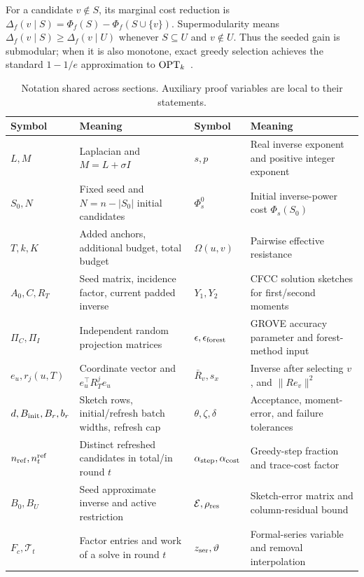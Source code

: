 For a candidate $v\notin S$, its marginal cost reduction is
$\Delta_f(v\mid S)=\Phi_f(S)-\Phi_f(S\cup\{v\})$.
Supermodularity means
$\Delta_f(v\mid S)\geq\Delta_f(v\mid U)$ whenever
$S\subseteq U$ and $v\notin U$. Thus the seeded gain is
submodular; when it is also monotone, exact greedy selection achieves
the standard $1-1/e$ approximation to $\mathrm{OPT}_k$~\cite{nemhauser1978}.

\begin{table}[t]
\centering\footnotesize
\caption{Notation shared across sections. Auxiliary proof variables are
local to their statements.}\label{tab:notation}
\begin{tabularx}{\textwidth}{@{}lXlX@{}}\toprule
Symbol & Meaning & Symbol & Meaning\\\midrule
$L,M$ & Laplacian and $M=L+\sigma I$ & $s,p$ & Real inverse exponent and positive integer exponent\\
$S_0,N$ & Fixed seed and $N=n-|S_0|$ initial candidates & $\Phi_s^0$ & Initial inverse-power cost $\Phi_s(S_0)$\\
$T,k,K$ & Added anchors, additional budget, total budget & $\Omega(u,v)$ & Pairwise effective resistance\\
$A_0,C,R_T$ & Seed matrix, incidence factor, current padded inverse & $Y_1,Y_2$ & CFCC solution sketches for first/second moments\\
$\Pi_C,\Pi_I$ & Independent random projection matrices & $\epsilon,\epsilon_{\rm forest}$ & GROVE accuracy parameter and forest-method input\\
$e_u,r_j(u,T)$ & Coordinate vector and $e_u^\top R_T^j e_u$ & $\bar R_v,s_x$ & Inverse after selecting $v$, and $\|Re_v\|^2$\\
$d,B_{\rm init},B_r,b_r$ & Sketch rows, initial/refresh batch widths, refresh cap & $\theta,\zeta,\delta$ & Acceptance, moment-error, and failure tolerances\\
$n_{\rm ref},n_t^{\rm ref}$ & Distinct refreshed candidates in total/in round $t$ & $\alpha_{\rm step},\alpha_{\rm cost}$ & Greedy-step fraction and trace-cost factor\\
$B_0,B_U$ & Seed approximate inverse and active restriction & $\mathcal E,\rho_{\rm res}$ & Sketch-error matrix and column-residual bound\\
$F_c,\mathcal T_t$ & Factor entries and work of a solve in round $t$ & $z_{\rm ser},\vartheta$ & Formal-series variable and removal interpolation\\
\bottomrule\end{tabularx}
\end{table}

